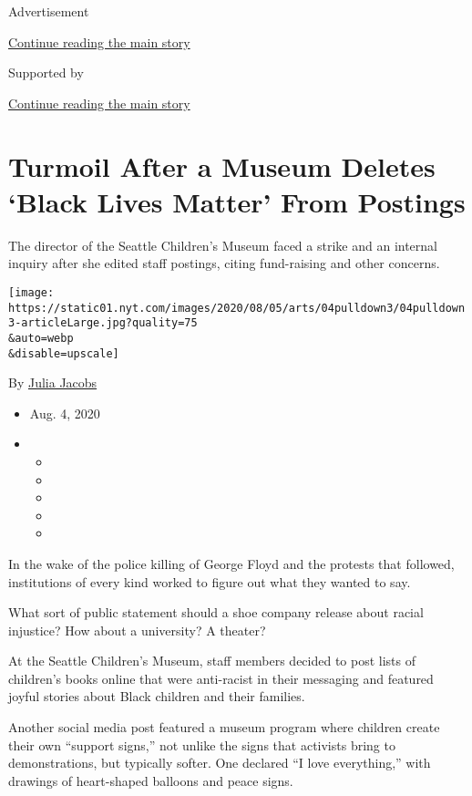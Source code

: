 Advertisement

\protect\hyperlink{after-top}{Continue reading the main story}

Supported by

\protect\hyperlink{after-sponsor}{Continue reading the main story}

\hypertarget{turmoil-after-a-museum-deletes-black-lives-matter-from-postings}{%
\section{Turmoil After a Museum Deletes `Black Lives Matter' From
Postings}\label{turmoil-after-a-museum-deletes-black-lives-matter-from-postings}}

The director of the Seattle Children's Museum faced a strike and an
internal inquiry after she edited staff postings, citing fund-raising
and other concerns.

\texttt{[image: https://static01.nyt.com/images/2020/08/05/arts/04pulldown3/04pulldown3-articleLarge.jpg?quality=75\\\&auto=webp\\\&disable=upscale]}

By \href{https://www.nytimes.com/by/julia-jacobs}{Julia Jacobs}

\begin{itemize}
\item
  Aug. 4, 2020
\item
  \begin{itemize}
  \item
  \item
  \item
  \item
  \item
  \end{itemize}
\end{itemize}

In the wake of the police killing of George Floyd and the protests that
followed, institutions of every kind worked to figure out what they
wanted to say.

What sort of public statement should a shoe company release about racial
injustice? How about a university? A theater?

At the Seattle Children's Museum, staff members decided to post lists of
children's books online that were anti-racist in their messaging and
featured joyful stories about Black children and their families.

Another social media post featured a museum program where children
create their own ``support signs,'' not unlike the signs that activists
bring to demonstrations, but typically softer. One declared ``I love
everything,'' with drawings of heart-shaped balloons and peace signs.

